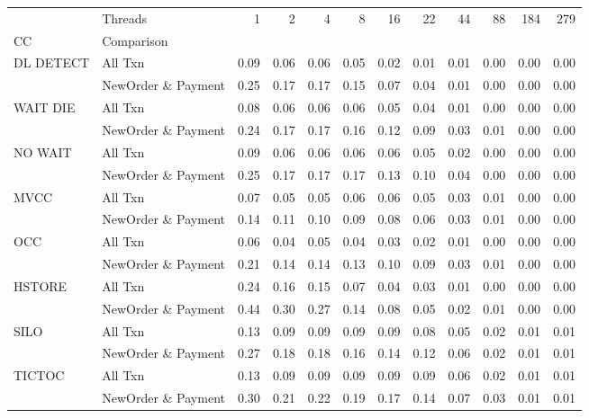 \begin{tabular}{llrrrrrrrrrr}
\toprule
       & Threads &  1   &  2   &  4   &  8   &  16  &  22  &  44  &  88  &  184 &  279 \\
CC & Comparison &      &      &      &      &      &      &      &      &      &      \\
\midrule
DL DETECT & All Txn & 0.09 & 0.06 & 0.06 & 0.05 & 0.02 & 0.01 & 0.01 & 0.00 & 0.00 & 0.00 \\
       & NewOrder \& Payment & 0.25 & 0.17 & 0.17 & 0.15 & 0.07 & 0.04 & 0.01 & 0.00 & 0.00 & 0.00 \\
WAIT DIE & All Txn & 0.08 & 0.06 & 0.06 & 0.06 & 0.05 & 0.04 & 0.01 & 0.00 & 0.00 & 0.00 \\
       & NewOrder \& Payment & 0.24 & 0.17 & 0.17 & 0.16 & 0.12 & 0.09 & 0.03 & 0.01 & 0.00 & 0.00 \\
NO WAIT & All Txn & 0.09 & 0.06 & 0.06 & 0.06 & 0.06 & 0.05 & 0.02 & 0.00 & 0.00 & 0.00 \\
       & NewOrder \& Payment & 0.25 & 0.17 & 0.17 & 0.17 & 0.13 & 0.10 & 0.04 & 0.00 & 0.00 & 0.00 \\
MVCC & All Txn & 0.07 & 0.05 & 0.05 & 0.06 & 0.06 & 0.05 & 0.03 & 0.01 & 0.00 & 0.00 \\
       & NewOrder \& Payment & 0.14 & 0.11 & 0.10 & 0.09 & 0.08 & 0.06 & 0.03 & 0.01 & 0.00 & 0.00 \\
OCC & All Txn & 0.06 & 0.04 & 0.05 & 0.04 & 0.03 & 0.02 & 0.01 & 0.00 & 0.00 & 0.00 \\
       & NewOrder \& Payment & 0.21 & 0.14 & 0.14 & 0.13 & 0.10 & 0.09 & 0.03 & 0.01 & 0.00 & 0.00 \\
HSTORE & All Txn & 0.24 & 0.16 & 0.15 & 0.07 & 0.04 & 0.03 & 0.01 & 0.00 & 0.00 & 0.00 \\
       & NewOrder \& Payment & 0.44 & 0.30 & 0.27 & 0.14 & 0.08 & 0.05 & 0.02 & 0.01 & 0.00 & 0.00 \\
SILO & All Txn & 0.13 & 0.09 & 0.09 & 0.09 & 0.09 & 0.08 & 0.05 & 0.02 & 0.01 & 0.01 \\
       & NewOrder \& Payment & 0.27 & 0.18 & 0.18 & 0.16 & 0.14 & 0.12 & 0.06 & 0.02 & 0.01 & 0.01 \\
TICTOC & All Txn & 0.13 & 0.09 & 0.09 & 0.09 & 0.09 & 0.09 & 0.06 & 0.02 & 0.01 & 0.01 \\
       & NewOrder \& Payment & 0.30 & 0.21 & 0.22 & 0.19 & 0.17 & 0.14 & 0.07 & 0.03 & 0.01 & 0.01 \\
\bottomrule
\end{tabular}
